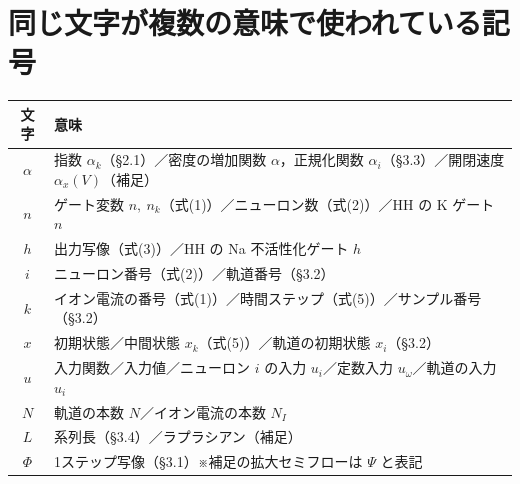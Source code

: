 \documentclass[a4paper,10pt]{ltjsarticle}
\begin{document}
\section{同じ文字が複数の意味で使われている記号}
\begin{center}
\begin{tabular}{cl}
\toprule
文字 & 意味 \\
\midrule
$\alpha$ & 指数 $\alpha_k$（§2.1）／密度の増加関数 $\alpha$，正規化関数 $\alpha_i$（§3.3）／開閉速度 $\alpha_x(V)$（補足） \\
$n$ & ゲート変数 $n,\ n_k$（式(1)）／ニューロン数（式(2)）／HH の K ゲート $n$ \\
$h$ & 出力写像（式(3)）／HH の Na 不活性化ゲート $h$ \\
$i$ & ニューロン番号（式(2)）／軌道番号（§3.2） \\
$k$ & イオン電流の番号（式(1)）／時間ステップ（式(5)）／サンプル番号（§3.2） \\
$x$ & 初期状態／中間状態 $x_k$（式(5)）／軌道の初期状態 $x_i$（§3.2） \\
$u$ & 入力関数／入力値／ニューロン $i$ の入力 $u_i$／定数入力 $u_\omega$／軌道の入力 $u_i$ \\
$N$ & 軌道の本数 $N$／イオン電流の本数 $N_I$ \\
$L$ & 系列長（§3.4）／ラプラシアン（補足） \\
$\Phi$ & 1ステップ写像（§3.1）\quad ※補足の拡大セミフローは $\Psi$ と表記 \\
\bottomrule
\end{tabular}
\end{center}
\end{document}
